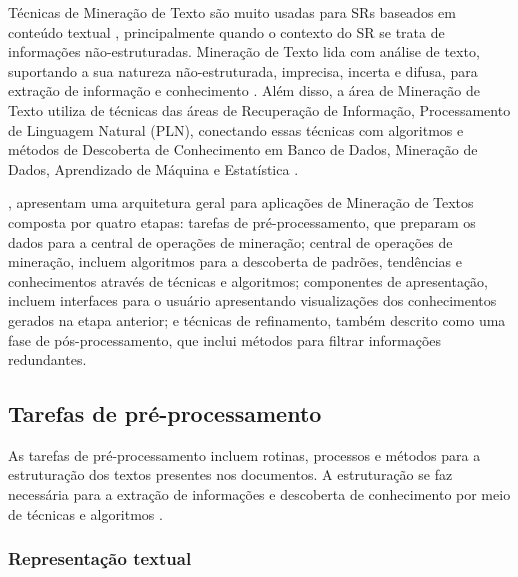 \documentclass[normaltoc, espacoumemeio, pnumromarab,ruledheader]{abnt}
\begin{document}
Técnicas de Mineração de Texto são muito usadas para SRs baseados em conteúdo textual \cite{Lops2011}, principalmente quando o contexto do SR se trata de informações não-estruturadas. Mineração de Texto lida com análise de texto, suportando a sua natureza não-estruturada, imprecisa, incerta e difusa, para extração de informação e conhecimento \cite{Hotho2005}.
Além disso, a área de Mineração de Texto utiliza de técnicas das áreas de Recuperação de Informação, Processamento de Linguagem Natural (PLN), conectando essas técnicas com algoritmos e métodos de Descoberta de Conhecimento em Banco de Dados, Mineração de Dados, Aprendizado de Máquina e Estatística \cite{Hotho2005}.


, apresentam uma arquitetura geral para aplicações de Mineração de Textos composta por quatro etapas: tarefas de pré-processamento, que preparam os dados para a central de operações de mineração; central de operações de mineração, incluem algoritmos para a descoberta de padrões, tendências e conhecimentos através de técnicas e algoritmos; componentes de apresentação, incluem interfaces para o usuário apresentando visualizações dos conhecimentos gerados na etapa anterior; e técnicas de refinamento, também descrito como uma fase de pós-processamento, que inclui métodos para filtrar informações redundantes.

\subsection{Tarefas de pré-processamento}
\label{subsec:preprocessamento}

As tarefas de pré-processamento incluem rotinas, processos e métodos para a estruturação dos textos presentes nos documentos.
A estruturação se faz necessária para a extração de informações e descoberta de conhecimento por meio de técnicas e algoritmos \cite{Hotho2005}.

\subsubsection{Representação textual}
\end{document}
